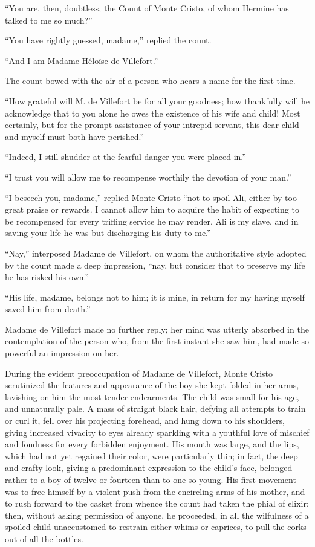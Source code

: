 “You are, then, doubtless, the Count of Monte Cristo, of whom Hermine
has talked to me so much?”

“You have rightly guessed, madame,” replied the count.

“And I am Madame Héloïse de Villefort.”

The count bowed with the air of a person who hears a name for the first
time.

“How grateful will M. de Villefort be for all your goodness; how
thankfully will he acknowledge that to you alone he owes the existence
of his wife and child! Most certainly, but for the prompt assistance of
your intrepid servant, this dear child and myself must both have
perished.”

“Indeed, I still shudder at the fearful danger you were placed in.”

“I trust you will allow me to recompense worthily the devotion of your
man.”

“I beseech you, madame,” replied Monte Cristo “not to spoil Ali, either
by too great praise or rewards. I cannot allow him to acquire the habit
of expecting to be recompensed for every trifling service he may
render. Ali is my slave, and in saving your life he was but discharging
his duty to me.”

“Nay,” interposed Madame de Villefort, on whom the authoritative style
adopted by the count made a deep impression, “nay, but consider that to
preserve my life he has risked his own.”

“His life, madame, belongs not to him; it is mine, in return for my
having myself saved him from death.”

Madame de Villefort made no further reply; her mind was utterly
absorbed in the contemplation of the person who, from the first instant
she saw him, had made so powerful an impression on her.

During the evident preoccupation of Madame de Villefort, Monte Cristo
scrutinized the features and appearance of the boy she kept folded in
her arms, lavishing on him the most tender endearments. The child was
small for his age, and unnaturally pale. A mass of straight black hair,
defying all attempts to train or curl it, fell over his projecting
forehead, and hung down to his shoulders, giving increased vivacity to
eyes already sparkling with a youthful love of mischief and fondness
for every forbidden enjoyment. His mouth was large, and the lips, which
had not yet regained their color, were particularly thin; in fact, the
deep and crafty look, giving a predominant expression to the child’s
face, belonged rather to a boy of twelve or fourteen than to one so
young. His first movement was to free himself by a violent push from
the encircling arms of his mother, and to rush forward to the casket
from whence the count had taken the phial of elixir; then, without
asking permission of anyone, he proceeded, in all the wilfulness of a
spoiled child unaccustomed to restrain either whims or caprices, to
pull the corks out of all the bottles.

